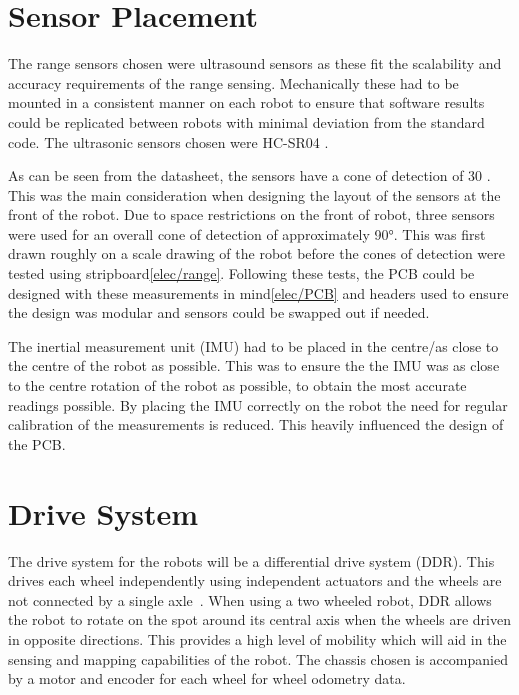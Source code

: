 \section{Sensor Placement}\label{mech/sensors}
The range sensors chosen were ultrasound sensors as these fit the scalability and accuracy requirements of the range sensing. Mechanically these had to be mounted in a consistent manner on each robot to ensure that software results could be replicated between robots with minimal deviation from the standard code. The ultrasonic sensors chosen were HC-SR04 .

As can be seen from the datasheet, the sensors have a cone of detection of 30 . This was the main consideration when designing the layout of the sensors at the front of the robot. Due to space restrictions on the front of robot, three sensors were used for an overall cone of detection of approximately \ang{90}. This was first drawn roughly on a scale drawing of the robot before the cones of detection were tested using stripboard\ref{elec/range}. Following these tests, the PCB could be designed with these measurements in mind\ref{elec/PCB} and headers used to ensure the design was modular and sensors could be swapped out if needed. 

The inertial measurement unit (IMU) had to be placed in the centre/as close to the centre of the robot as possible. This was to ensure the the IMU was as close to the centre rotation of the robot as possible, to obtain the most accurate readings possible. By placing the IMU correctly on the robot the need for regular calibration of the measurements is reduced. This heavily influenced the design of the PCB. 


\section{Drive System}\label{mech/drive}

The drive system for the robots will be a differential drive system (DDR).
This drives each wheel independently using independent actuators and the
wheels are not connected by a single axle~\cite[p.~146]{braunl_embedded_2013}.
When using a two wheeled robot, DDR allows the
robot to rotate on the spot around its central axis when the wheels are
driven in opposite directions. This provides a high level of mobility which
will aid in the sensing and mapping capabilities of the robot. The chassis chosen is accompanied by a motor and encoder for each wheel for wheel odometry data.

